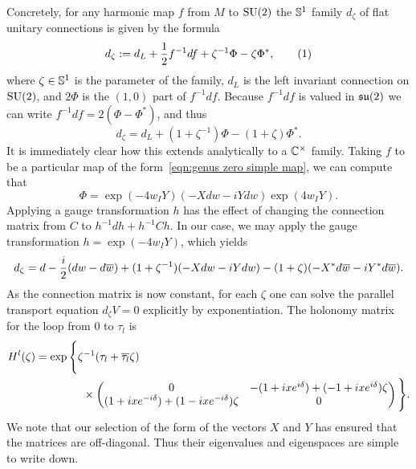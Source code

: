 \documentclass{article}
\begin{document}
Concretely, for any harmonic map $f$ from $M$ to $\SU(2)$ the $\S^1$ family $d_\zeta$ of flat unitary connections is given by the formula
\[
d_\zeta := d_L + \frac{1}{2}f^{-1}df + \zeta^{-1}\Phi - \zeta\Phi^*,
\labelthis{eqn:flat connection translation}
\]
where $\zeta\in\S^1$ is the parameter of the family, $d_L$ is the left invariant connection on $\SU(2)$, and $2\Phi$ is the $(1,0)$ part of $f^{-1}df$. Because $f^{-1}df$ is valued in $\su(2)$ we can write $f^{-1}df = 2(\Phi - \Phi^*)$, and thus
\[
d_\zeta = d_L + (1+\zeta^{-1})\Phi - (1+\zeta)\Phi^*.
\]
It is immediately clear how this extends analytically to a $\C^\times$ family. Taking $f$ to be a particular map of the form~\eqref{eqn:genus zero simple map}, we can compute that
\[
\Phi = \exp(-4w_I Y)(-Xdw -iYdw)\exp(4w_I Y).
\]
Applying a gauge transformation $h$ has the effect of changing the connection matrix from $C$ to $h^{-1}dh + h^{-1}Ch$. In our case, we may apply the gauge transformation $h = \exp(-4 w_I Y)$, which yields
\[
d_\zeta = d -\frac{\iu}{2}(dw - d\bar{w}) + (1+\zeta^{-1})(-Xdw -iYdw) - (1+\zeta)(-X^*d\bar{w} -iY^*d\bar{w}).
\]
As the connection matrix is now constant, for each $\zeta$ one can solve the parallel transport equation $d_\zeta V = 0$ explicitly by exponentiation.
The holonomy matrix for the loop from $0$ to $\tau_l$ is
\begin{align*}
H^l(\zeta)
&= \exp \Bigg\{ \zeta^{-1}(\tau_l + \bar{\tau_l}\zeta)  \\
&\hspace{1.5cm}\times\begin{pmatrix}
0 & - (1 + \iu xe^{\iu \delta}) + (-1 + \iu x e^{\iu \delta})\zeta \\
(1+\iu xe^{-\iu \delta}) + (1-\iu xe^{-\iu \delta})\zeta & 0
\end{pmatrix}\Bigg\}.
\end{align*}
We note that our selection of the form of the vectors $X$ and $Y$ has ensured that the matrices are off-diagonal. Thus their eigenvalues and eigenspaces are simple to write down.
\end{document}
